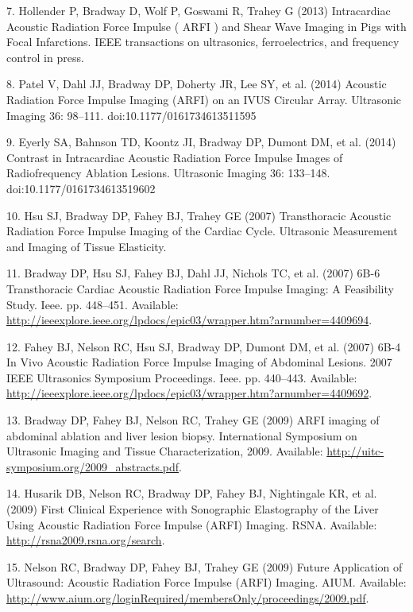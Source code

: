 \documentclass[]{article}
\begin{document}
7. Hollender P, Bradway D, Wolf P, Goswami R, Trahey G (2013)
Intracardiac Acoustic Radiation Force Impulse ( ARFI ) and Shear Wave
Imaging in Pigs with Focal Infarctions. IEEE transactions on
ultrasonics, ferroelectrics, and frequency control in press.

8. Patel V, Dahl JJ, Bradway DP, Doherty JR, Lee SY, et al. (2014)
Acoustic Radiation Force Impulse Imaging (ARFI) on an IVUS Circular
Array. Ultrasonic Imaging 36: 98--111. doi:10.1177/0161734613511595

9. Eyerly SA, Bahnson TD, Koontz JI, Bradway DP, Dumont DM, et al.
(2014) Contrast in Intracardiac Acoustic Radiation Force Impulse Images
of Radiofrequency Ablation Lesions. Ultrasonic Imaging 36: 133--148.
doi:10.1177/0161734613519602

10. Hsu SJ, Bradway DP, Fahey BJ, Trahey GE (2007) Transthoracic
Acoustic Radiation Force Impulse Imaging of the Cardiac Cycle.
Ultrasonic Measurement and Imaging of Tissue Elasticity.

11. Bradway DP, Hsu SJ, Fahey BJ, Dahl JJ, Nichols TC, et al. (2007)
6B-6 Transthoracic Cardiac Acoustic Radiation Force Impulse Imaging: A
Feasibility Study. Ieee. pp. 448--451. Available:
\href{http://ieeexplore.ieee.org/lpdocs/epic03/wrapper.htm?arnumber=4409694}{http://ieeexplore.ieee.org/lpdocs/epic03/wrapper.htm?arnumber=4409694}.

12. Fahey BJ, Nelson RC, Hsu SJ, Bradway DP, Dumont DM, et al. (2007)
6B-4 In Vivo Acoustic Radiation Force Impulse Imaging of Abdominal
Lesions. 2007 IEEE Ultrasonics Symposium Proceedings. Ieee. pp.
440--443. Available:
\href{http://ieeexplore.ieee.org/lpdocs/epic03/wrapper.htm?arnumber=4409692}{http://ieeexplore.ieee.org/lpdocs/epic03/wrapper.htm?arnumber=4409692}.

13. Bradway DP, Fahey BJ, Nelson RC, Trahey GE (2009) ARFI imaging of
abdominal ablation and liver lesion biopsy. International Symposium on
Ultrasonic Imaging and Tissue Characterization, 2009. Available:
\href{http://uitc-symposium.org/2009\_abstracts.pdf}{http://uitc-symposium.org/2009\_abstracts.pdf}.

14. Husarik DB, Nelson RC, Bradway DP, Fahey BJ, Nightingale KR, et al.
(2009) First Clinical Experience with Sonographic Elastography of the
Liver Using Acoustic Radiation Force Impulse (ARFI) Imaging. RSNA.
Available:
\href{http://rsna2009.rsna.org/search}{http://rsna2009.rsna.org/search}.

15. Nelson RC, Bradway DP, Fahey BJ, Trahey GE (2009) Future Application
of Ultrasound: Acoustic Radiation Force Impulse (ARFI) Imaging. AIUM.
Available:
\href{http://www.aium.org/loginRequired/membersOnly/proceedings/2009.pdf}{http://www.aium.org/loginRequired/membersOnly/proceedings/2009.pdf}.
\end{document}
